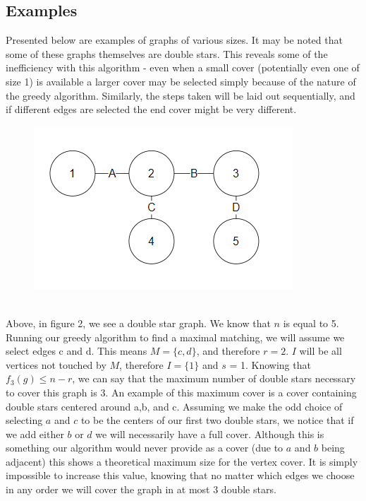 \documentclass{article}
\begin{document}
		\subsection{Examples}
		Presented below are examples of graphs of various sizes. It may be noted that some of these graphs themselves are double stars. This reveals some of the inefficiency with this algorithm - even when a small cover (potentially even one of size 1) is available a larger cover may be selected simply because of the nature of the greedy algorithm. Similarly, the steps taken will be laid out sequentially, and if different edges are selected the end cover might be very different.
		 \\
				\begin{figure}[H]
				\caption{}
				\includegraphics{Figure2}
			\end{figure}
		\\
			Above, in figure 2, we see a double star graph. We know that $n$ is equal to 5. Running our greedy algorithm to find a maximal matching, we will assume we select edges c and d. This means $M = \{c,d\}$, and therefore $r = 2$. $I$ will be all vertices not touched by $M$, therefore $I = \{1\}$ and $s$ = 1. Knowing that $f_{3}(g) \leq n-r$, we can say that the maximum number of double stars necessary to cover this graph is 3. An example of this maximum cover is a cover containing double stars centered around a,b, and c. Assuming we make the odd choice of selecting $a$ and $c$ to be the centers of our first two double stars, we notice that if we add either $b$ or $d$ we will necessarily have a full cover. Although this is something our algorithm would never provide as a cover (due to $a$ and $b$ being adjacent) this shows a theoretical maximum size for the vertex cover. It is simply impossible to increase this value, knowing that no matter which edges we choose in any order we will cover the graph in at most 3 double stars.
	\newtheorem{theorem}{Theorem}
\end{document}
